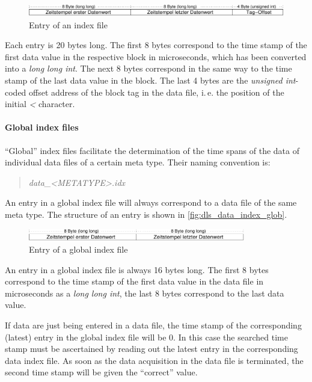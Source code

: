 \documentclass[a4paper,12pt,BCOR6mm,bibtotoc,idxtotoc]{scrbook}
\begin{document}
\begin{figure}[htb] \begin{center} \includegraphics[height=15pt]{bilder/dls_data_index} \end{center} \caption{Entry of an index file} \label{fig:dls_data_index} \end{figure}

Each entry is 20 bytes long. The first 8 bytes correspond to the time stamp of
the first data value in the respective block in microseconds, which has been
converted into a \textit{long long int}. The next 8 bytes correspond in the
same way to the time stamp of the last data value in the block. The last 4
bytes are the \textit{unsigned int}-coded offset address of the block tag in
the data file, i.\,e. the position of the initial \textit{\textless}
character.

\paragraph{Global index files} ``Global'' index files facilitate the
determination of the time spans of the data of individual data files of a
certain meta type. Their naming convention is:

\begin{quote} \textit{data\_\textless METATYPE\textgreater.idx} \end{quote}

An entry in a global index file will always correspond to a data file of the
same meta type. The structure of an entry is shown in
\autoref{fig:dls_data_index_glob}.

\begin{figure}[htb] \begin{center} \includegraphics[height=15pt]{bilder/dls_data_index_glob} \end{center} \caption{Entry of a global index file} \label{fig:dls_data_index_glob} \end{figure}

An entry in a global index file is always 16 bytes long. The first 8 bytes correspond to the time stamp of the first data value in the data file in microseconds as a \textit{long long int}, the last 8 bytes correspond to the last data value.

If data are just being entered in a data file, the time stamp of the corresponding (latest) entry in the global index file will be 0. In this case the searched time stamp must be ascertained by reading out the latest entry in the corresponding data index file. As soon as the data acquisition in the data file is terminated, the second time stamp will be given the ``correct'' value.
\end{document}
